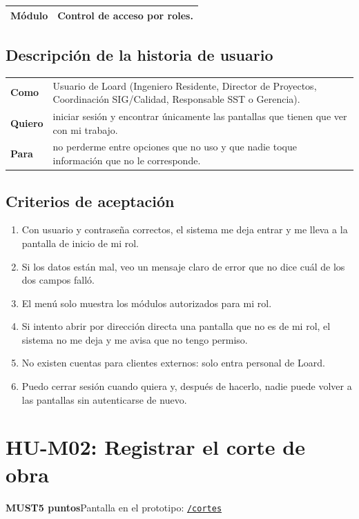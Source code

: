 \documentclass[11pt]{article}
\newcommand{\urlapp}{https://thankstochatgpt.github.io/LOARD}
\newcommand{\app}[1]{\href{\urlapp#1}{\texttt{#1}}}
\newcommand{\etiqueta}[1]{\colorbox{barra}{\textbf{\color{marca}#1}}}
\begin{document}
\begin{tabular}{>{\bfseries}p{2.4cm} p{13.4cm}}
\toprule
Módulo & Control de acceso por roles. \\
\bottomrule
\end{tabular}

\subsection*{Descripción de la historia de usuario}

\begin{tabular}{>{\bfseries}p{2.4cm} p{13.4cm}}
\toprule
Como & Usuario de Loard (Ingeniero Residente, Director de Proyectos, Coordinación SIG/Calidad, Responsable SST o Gerencia). \\
Quiero & iniciar sesión y encontrar únicamente las pantallas que tienen que ver con mi trabajo. \\
Para & no perderme entre opciones que no uso y que nadie toque información que no le corresponde. \\
\bottomrule
\end{tabular}

\subsection*{Criterios de aceptación}

\begin{enumerate}
\item Con usuario y contraseña correctos, el sistema me deja entrar y me lleva a la pantalla de inicio de mi rol.
\item Si los datos están mal, veo un mensaje claro de error que no dice cuál de los dos campos falló.
\item El menú solo muestra los módulos autorizados para mi rol.
\item Si intento abrir por dirección directa una pantalla que no es de mi rol, el sistema no me deja y me avisa que no tengo permiso.
\item No existen cuentas para clientes externos: solo entra personal de Loard.
\item Puedo cerrar sesión cuando quiera y, después de hacerlo, nadie puede volver a las pantallas sin autenticarse de nuevo.
\end{enumerate}


\newpage
\section*{HU-M02: Registrar el corte de obra}
\etiqueta{MUST}\quad\etiqueta{5 puntos}\quad Pantalla en el prototipo: \app{/cortes}
\end{document}
